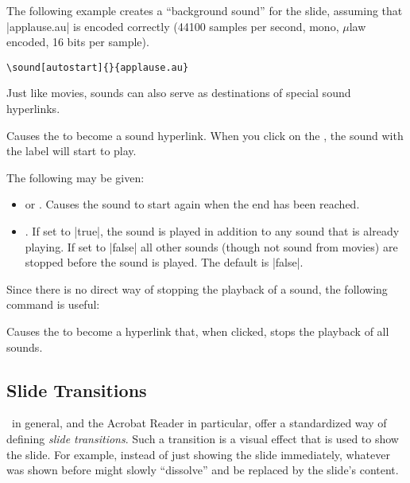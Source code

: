 \begin{command}{\sound{}}
  \example
  The following example creates a ``background sound'' for the slide, assuming that |applause.au| is encoded correctly (44100 samples per second, mono, $\mu$law encoded, 16 bits per sample).

\begin{verbatim}
\sound[autostart]{}{applause.au}
\end{verbatim}
\end{command}

Just like movies, sounds can also serve as  destinations of special sound hyperlinks.

\begin{command}{\hyperlinksound{}}
  Causes the  to become a sound hyperlink. When you click on the , the sound with the label  will start to play.

  The following  may be given:
  \begin{itemize}
  \item
     or . Causes the sound to start again when the end has been reached.
  \item
    . If set to |true|, the sound is played in addition to any sound that is already playing. If set to |false| all other sounds (though not sound from movies) are stopped before the sound is played. The default is |false|.
  \end{itemize}
\end{command}

Since there is no direct way of stopping the playback of a sound, the following command is useful:

\begin{command}{\hyperlinkmute{}}
  Causes the  to become a hyperlink that, when clicked, stops the playback of all sounds.
\end{command}


\subsection{Slide Transitions}

\pdf\ in general, and the Acrobat Reader in particular, offer a standardized way of defining \emph{slide transitions}. Such a transition is a visual effect that is used to show the slide. For example, instead of just showing the slide immediately, whatever was shown before might slowly ``dissolve'' and be replaced by the slide's content.

